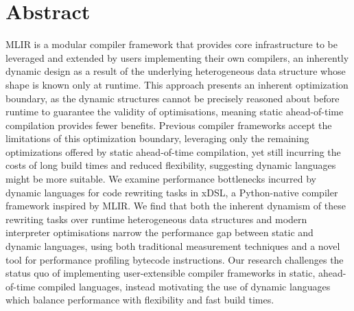\chapter*{Abstract}


\makeatletter
{\large\textsl{\@title}}
\makeatother
\vspace{0.5em}

MLIR is a modular compiler framework that provides core infrastructure to be leveraged and extended by users implementing their own compilers, an inherently dynamic design as a result of the underlying heterogeneous data structure whose shape is known only at runtime. %
This approach presents an inherent optimization boundary, as the dynamic structures cannot be precisely reasoned about before runtime to guarantee the validity of optimisations, meaning static ahead-of-time compilation provides fewer benefits.
Previous compiler frameworks accept the limitations of this optimization boundary, leveraging only the remaining optimizations offered by static ahead-of-time compilation, yet still incurring the costs of long build times and reduced flexibility, suggesting dynamic languages might be more suitable.
We examine performance bottlenecks incurred by dynamic languages for code rewriting tasks in xDSL, a Python-native compiler framework inspired by MLIR.
We find that both the inherent dynamism of these rewriting tasks over runtime heterogeneous data structures and modern interpreter optimisations narrow the performance gap between static and dynamic languages, using both traditional measurement techniques and a novel tool for performance profiling bytecode instructions.
Our research challenges the status quo of implementing user-extensible compiler frameworks in static, ahead-of-time compiled languages, instead motivating the use of dynamic languages which balance performance with flexibility and fast build times.

